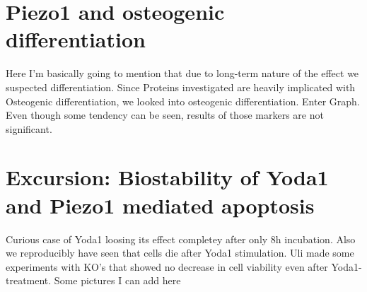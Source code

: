 \section{Piezo1 and osteogenic differentiation}
Here I'm basically going to mention that due to long-term nature of the effect we suspected differentiation. Since Proteins investigated are heavily implicated with Osteogenic differentiation, we looked into osteogenic differentiation. Enter Graph. Even though some tendency can be seen, results of those markers are not significant. 


\section{Excursion: Biostability of Yoda1 and Piezo1 mediated apoptosis}
\label{sec:biostability}
Curious case of Yoda1 loosing its effect completey after only 8h incubation. Also we reproducibly have seen that cells die after Yoda1 stimulation. Uli made some experiments with KO's that showed no decrease in cell viability even after Yoda1-treatment. Some pictures I can add here